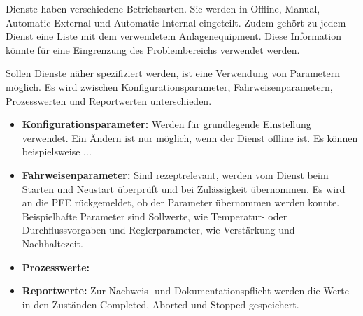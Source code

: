 Dienste haben verschiedene Betriebsarten. Sie werden in Offline, Manual, Automatic External und Automatic Internal eingeteilt. Zudem gehört zu jedem Dienst eine Liste mit dem verwendetem Anlagenequipment. Diese Information könnte für eine Eingrenzung des Problembereichs verwendet werden.

Sollen Dienste näher spezifiziert werden, ist eine Verwendung von Parametern möglich. Es wird zwischen Konfigurationsparameter, Fahrweisenparametern, Prozesswerten und Reportwerten unterschieden. 
\begin{itemize}
\item \textbf{Konfigurationsparameter:} Werden für grundlegende Einstellung verwendet. Ein Ändern ist nur möglich, wenn der Dienst offline ist. Es können beispielsweise ...
\item \textbf{Fahrweisenparameter:} Sind rezeptrelevant, werden vom Dienst beim Starten und Neustart überprüft und bei Zulässigkeit übernommen. Es wird an die PFE rückgemeldet, ob der Parameter übernommen werden konnte. Beispielhafte Parameter sind Sollwerte, wie Temperatur- oder Durchflussvorgaben und Reglerparameter, wie Verstärkung und Nachhaltezeit.
\item \textbf{Prozesswerte:} 
\item \textbf{Reportwerte:} Zur Nachweis- und Dokumentationspflicht werden die Werte in den Zuständen Completed, Aborted und Stopped gespeichert.
\end{itemize}

